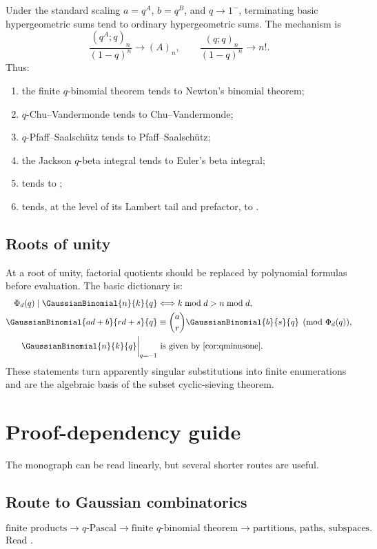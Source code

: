 \documentclass[11pt,a4paper,oneside,openany]{book}
\theoremstyle{definition}
\theoremstyle{remark}
\begin{document}
Under the standard scaling $a=q^A$, $b=q^B$, and $q\to1^-$, terminating basic hypergeometric sums tend to ordinary hypergeometric sums.  The mechanism is
\[
 \frac{(q^A;q)_n}{(1-q)^n}\longrightarrow(A)_n,
 \qquad
 \frac{(q;q)_n}{(1-q)^n}\longrightarrow n!.
\]
Thus:
\begin{enumerate}
\item the finite $q$-binomial theorem tends to Newton's binomial theorem;
\item $q$-Chu--Vandermonde tends to Chu--Vandermonde;
\item $q$-Pfaff--Saalsch\"utz tends to Pfaff--Saalsch\"utz;
\item the Jackson $q$-beta integral tends to Euler's beta integral;
\item {} tends to ;
\item {} tends, at the level of its Lambert tail and prefactor, to .
\end{enumerate}

\section{Roots of unity}

At a root of unity, factorial quotients should be replaced by polynomial formulas before evaluation.  The basic dictionary is:
\begin{align*}
 \Phi_d(q)\mid\GaussianBinomial{n}{k}{q}
 &\Longleftrightarrow k\bmod d>n\bmod d,\\
 \GaussianBinomial{ad+b}{rd+s}{q}
 &\equiv\binom ar\GaussianBinomial{b}{s}{q}\pmod{\Phi_d(q)},\\
 \GaussianBinomial{n}{k}{q}\bigg|_{q=-1}
 &\text{ is given by \Cref{cor:qminusone}.}
\end{align*}
These statements turn apparently singular substitutions into finite enumerations and are the algebraic basis of the subset cyclic-sieving theorem.

\chapter{Proof-dependency guide}\label{app:dependencies}

The monograph can be read linearly, but several shorter routes are useful.

\section*{Route to Gaussian combinatorics}
\[
 \text{finite products}
 \longrightarrow q\text{-Pascal}
 \longrightarrow \text{finite }q\text{-binomial theorem}
 \longrightarrow \text{partitions, paths, subspaces}.
\]
Read .
\end{document}
